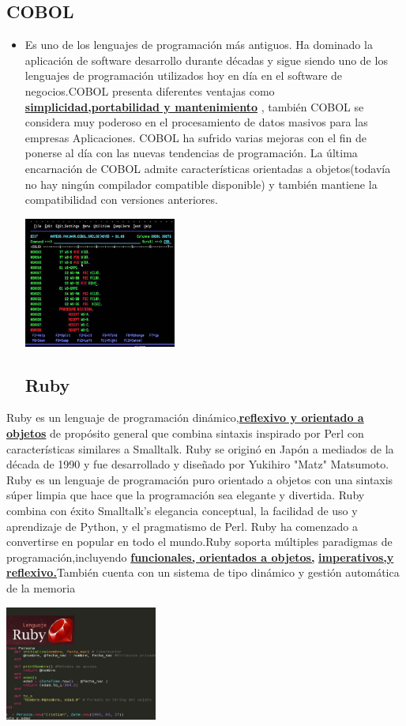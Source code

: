 \documentclass[twoside,twocolumn]{article}
\begin{document}
\subsection{COBOL}
\begin{itemize}
\item Es uno de los lenguajes de programación más antiguos. Ha dominado la aplicación de software desarrollo durante décadas y sigue siendo uno de los lenguajes de programación utilizados hoy en día en el software de negocios.COBOL presenta diferentes ventajas como
{\bf \underline{simplicidad,portabilidad y mantenimiento}}
, también COBOL se considera muy poderoso en el procesamiento de datos masivos para las empresas Aplicaciones. COBOL ha sufrido varias mejoras con el fin de ponerse al día con las nuevas tendencias de programación. La última encarnación de COBOL admite características orientadas a objetos(todavía no hay ningún compilador compatible disponible) y también mantiene la compatibilidad con versiones anteriores.
\begin{center}
	\includegraphics[width=5cm]{./Imagenes/3} 
	\end{center}
\subsection{Ruby}
\end{itemize}
Ruby es un lenguaje de programación dinámico,{\bf \underline {reflexivo y orientado a objetos}}  de propósito general que combina sintaxis
inspirado por Perl con características similares a Smalltalk. Ruby se originó en Japón a mediados de la década de 1990 y fue
desarrollado y diseñado por Yukihiro "Matz" Matsumoto. Ruby es un lenguaje de programación puro orientado a objetos
con una sintaxis súper limpia que hace que la programación sea elegante y divertida. Ruby combina con éxito Smalltalk's
elegancia conceptual, la facilidad de uso y aprendizaje de Python, y el pragmatismo de Perl. Ruby ha comenzado a convertirse en
popular en todo el mundo.Ruby soporta múltiples paradigmas de programación,incluyendo {\bf \underline {funcionales, orientados a objetos,}}
{\bf \underline {imperativos,y reflexivo.}}También cuenta con un sistema de tipo dinámico y gestión automática de la memoria
\begin{center}
	\includegraphics[width=5cm]{./Imagenes/2} 
	\end{center}
\end{document}
